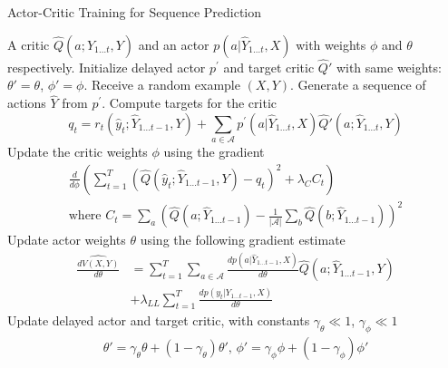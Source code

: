 \documentclass{article} \usepackage{iclr2017_conference,times}
\begin{document}
\begin{algorithm}
    \caption{Actor-Critic Training for Sequence Prediction}
    \label{algo:algo1}
    \begin{algorithmic}[1]
    \REQUIRE 
        A critic $\hat{Q}(a;\hat{Y}_{1 \ldots t}, Y)$
        and an actor $p(a|\hat{Y}_{1 \ldots t}, X)$ with
        weights $\phi$ and $\theta$ respectively.
    \STATE Initialize delayed actor $p^{'}$ 
    and target critic $\hat{Q}'$ with same weights: $\theta' = \theta$, $\phi' = \phi$.
    \STATE Receive a random example $(X, Y)$.
    \STATE Generate a sequence of actions $\hat{Y}$ from $p^{'}$.
    \STATE Compute targets for the critic
    \begin{equation*}
        q_t = r_t(\hat{y}_t;\hat{Y}_{1 \ldots t - 1}, Y)
        + \sum\limits_{a \in \mathcal{A}}
        p^{'}(a|\hat{Y}_{1 \ldots t}, X)
        \hat{Q}'(a;\hat{Y}_{1 \ldots t}, Y)
    \end{equation*}       
    \STATE Update the critic weights $\phi$ using the gradient
    \begin{align*}
    \frac{d}{d\phi}\left(
        \sum_{t=1}^{T} 
        \left(\hat{Q}(\hat{y}_t;\hat{Y}_{1 \ldots t - 1}, Y) - q_t \right)^2
        + \lambda_C C_t
    \right) \\
    \textrm{where } C_t = \sum_{a}\left( 
        \hat{Q}(a; \hat{Y}_{1 \ldots t-1}) - 
        \frac{1}{|\mathcal{A}|}\sum_{b}\hat{Q}(b; \hat{Y}_{1 \ldots t-1}) 
    \right)^2
    \end{align*}
    \STATE Update actor weights $\theta$ using the following gradient estimate
    \begin{align*}
        \widehat{\frac{dV(X,Y)}{d\theta}} &=
        \sum\limits_{t=1}^T
        \sum\limits_{a \in \mathcal{A}}
        \frac{d p(a|\hat{Y}_{1 \ldots t - 1}, X)}{d \theta}
         \hat{Q}(a;\hat{Y}_{1 \ldots t - 1}, Y)
\\
         &+ \lambda_{LL} \sum\limits_{t=1}^T 
        \frac{d p(y_t|Y_{1 \ldots t - 1}, X)}{d \theta}
    \end{align*}
    \STATE Update delayed actor and target critic, with constants 
    $\gamma_{\theta} \ll 1$, $\gamma_{\phi} \ll 1$
        \begin{align*}
            \theta' = \gamma_{\theta} \theta + (1 - \gamma_{\theta}) \theta',\, 
            \phi' = \gamma_{\phi} \phi + (1 - \gamma_{\phi}) \phi'
        \end{align*}
    \ENDWHILE
    \end{algorithmic}
\end{algorithm}
\end{document}
